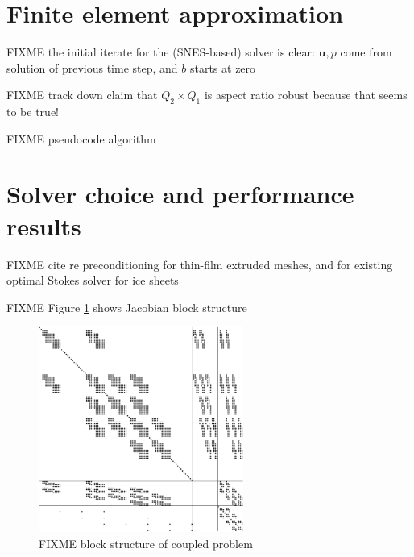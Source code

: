 \documentclass[letterpaper,final,12pt,reqno]{amsart}
\newcommand{\bu}{\mathbf{u}}
\begin{document}


\section{Finite element approximation}  \label{sec:finiteelement}

FIXME the initial iterate for the (SNES-based) solver is clear: $\bu,p$ come from solution of previous time step, and $b$ starts at zero

FIXME track down \cite{IsaacStadlerGhattas2015} claim that $Q_2\times Q_1$ is aspect ratio robust because that seems to be true!

FIXME pseudocode algorithm


\section{Solver choice and performance results} \label{sec:results}

FIXME cite \cite{Tuminaroetal2016} re preconditioning for thin-film extruded meshes, and \cite{IsaacStadlerGhattas2015} for existing optimal Stokes solver for ice sheets

FIXME Figure \ref{fig:blockstructure} shows Jacobian block structure

\begin{figure}[ht]
\begin{center}
\includegraphics[width=0.6\textwidth]{figs/coarsespy.pdf}
\end{center}
\caption{FIXME block structure of coupled problem}
\label{fig:blockstructure}
\end{figure}
\end{document}
